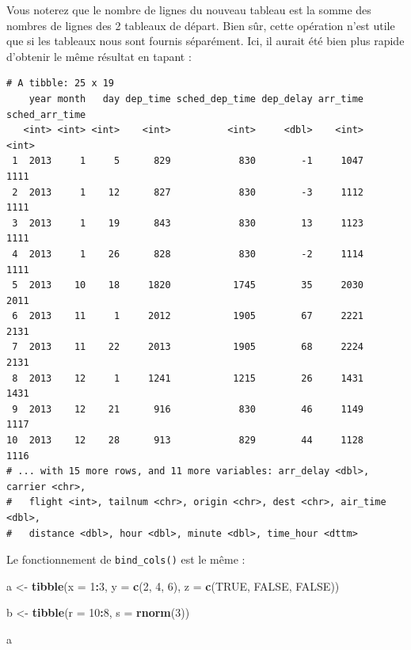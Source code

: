 \documentclass[a4paperpaper,]{article}
\newenvironment{Shaded}{\begin{snugshade}}{\end{snugshade}}
\newcommand{\KeywordTok}[1]{\textcolor[rgb]{0.13,0.29,0.53}{\textbf{#1}}}
\newcommand{\DataTypeTok}[1]{\textcolor[rgb]{0.13,0.29,0.53}{#1}}
\newcommand{\DecValTok}[1]{\textcolor[rgb]{0.00,0.00,0.81}{#1}}
\newcommand{\StringTok}[1]{\textcolor[rgb]{0.31,0.60,0.02}{#1}}
\newcommand{\OtherTok}[1]{\textcolor[rgb]{0.56,0.35,0.01}{#1}}
\newcommand{\OperatorTok}[1]{\textcolor[rgb]{0.81,0.36,0.00}{\textbf{#1}}}
\newcommand{\NormalTok}[1]{#1}
\theoremstyle{definition}
\theoremstyle{definition}
\theoremstyle{definition}
\theoremstyle{remark}
\begin{document}
Vous noterez que le nombre de lignes du nouveau tableau est la somme des
nombres de lignes des 2 tableaux de départ. Bien sûr, cette opération
n'est utile que si les tableaux nous sont fournis séparément. Ici, il
aurait été bien plus rapide d'obtenir le même résultat en tapant :

\begin{Shaded}
\end{Shaded}

\begin{verbatim}
# A tibble: 25 x 19
    year month   day dep_time sched_dep_time dep_delay arr_time sched_arr_time
   <int> <int> <int>    <int>          <int>     <dbl>    <int>          <int>
 1  2013     1     5      829            830        -1     1047           1111
 2  2013     1    12      827            830        -3     1112           1111
 3  2013     1    19      843            830        13     1123           1111
 4  2013     1    26      828            830        -2     1114           1111
 5  2013    10    18     1820           1745        35     2030           2011
 6  2013    11     1     2012           1905        67     2221           2131
 7  2013    11    22     2013           1905        68     2224           2131
 8  2013    12     1     1241           1215        26     1431           1431
 9  2013    12    21      916            830        46     1149           1117
10  2013    12    28      913            829        44     1128           1116
# ... with 15 more rows, and 11 more variables: arr_delay <dbl>, carrier <chr>,
#   flight <int>, tailnum <chr>, origin <chr>, dest <chr>, air_time <dbl>,
#   distance <dbl>, hour <dbl>, minute <dbl>, time_hour <dttm>
\end{verbatim}

Le fonctionnement de \texttt{bind\_cols()} est le même :

\begin{Shaded}
\begin{Highlighting}[]
\NormalTok{a <-}\StringTok{ }\KeywordTok{tibble}\NormalTok{(}\DataTypeTok{x =} \DecValTok{1}\OperatorTok{:}\DecValTok{3}\NormalTok{, }
            \DataTypeTok{y =} \KeywordTok{c}\NormalTok{(}\DecValTok{2}\NormalTok{, }\DecValTok{4}\NormalTok{, }\DecValTok{6}\NormalTok{),}
            \DataTypeTok{z =} \KeywordTok{c}\NormalTok{(}\OtherTok{TRUE}\NormalTok{, }\OtherTok{FALSE}\NormalTok{, }\OtherTok{FALSE}\NormalTok{))}

\NormalTok{b <-}\StringTok{ }\KeywordTok{tibble}\NormalTok{(}\DataTypeTok{r =} \DecValTok{10}\OperatorTok{:}\DecValTok{8}\NormalTok{, }
            \DataTypeTok{s =} \KeywordTok{rnorm}\NormalTok{(}\DecValTok{3}\NormalTok{))}

\NormalTok{a}
\end{Highlighting}
\end{Shaded}
\end{document}
